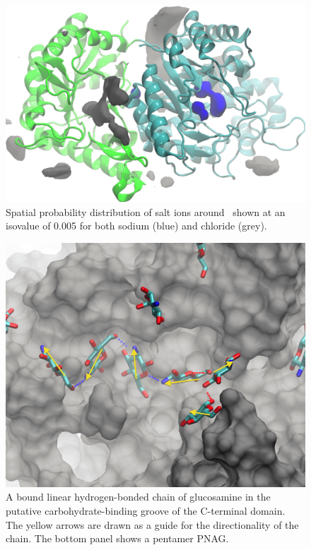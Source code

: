 \begin{figure}[htbp]
\centering
\includegraphics[width=6.23in]{figures/results4/pgab_glucosamine_dt10_compact_res_fitted_salt.png}
\caption[Ionic distribution]{Spatial probability distribution of salt ions around \pgab\ shown at an isovalue of 0.005 for both sodium (blue) and chloride (grey).}
\label{fig:salt_density_distribution}
\end{figure}

\begin{figure}[htbp]
\centering
\includegraphics[width=6in]{figures/results4/glucosamine_binding_direction_suggestive.png}
\caption[Polymer directionality]{A bound linear hydrogen-bonded chain of glucosamine in the putative carbohydrate-binding groove of the C-terminal domain.  The yellow arrows are drawn as a guide for the directionality of the chain. The bottom panel shows a pentamer PNAG.}
\label{fig:directionality}
\end{figure}

